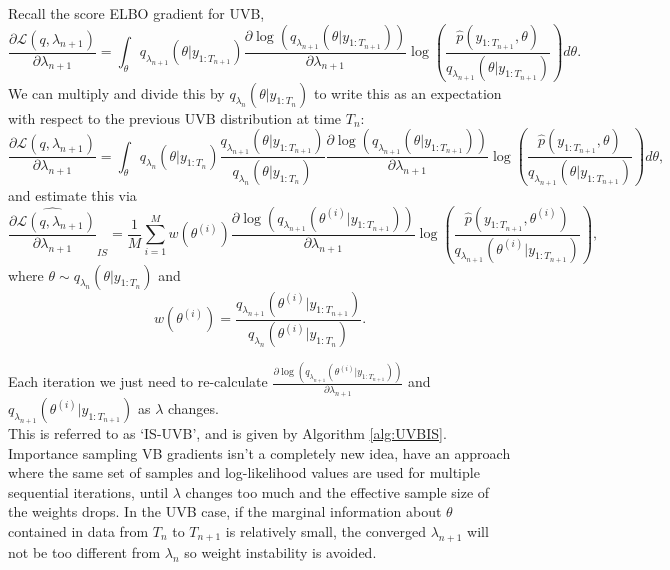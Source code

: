 \documentclass[12pt,a4paper]{article}\usepackage[]{graphicx}\usepackage[]{color}
\begin{document}
Recall the score ELBO gradient for UVB,
\begin{equation}
\label{UVBIS:scoreGrad}
\frac{\partial\mathcal{L}(q, \lambda_{n+1})}{\partial \lambda_{n+1}} = \int_{\theta} q_{\lambda_{n+1}}(\theta | y_{1:T_{n+1}}) \frac{\partial \log(q_{\lambda_{n+1}}(\theta | y_{1:T_{n+1}}))}{\partial \lambda_{n+1}} \log \left(\frac{\hat{p}(y_{1:T_{n+1}}, \theta)}{q_{\lambda_{n+1}}(\theta | y_{1:T_{n+1}})} \right) d\theta.
\end{equation}
We can multiply and divide this by $q_{\lambda_n}(\theta | y_{1:T_n})$ to write this as an expectation with respect to the previous UVB distribution at time $T_n$:
\begin{equation}
\label{UVBIS:scoreGradIS}
\frac{\partial\mathcal{L}(q, \lambda_{n+1})}{\partial \lambda_{n+1}} = \int_{\theta} q_{\lambda_{n}}(\theta | y_{1:T_{n}})\frac{q_{\lambda_{n+1}}(\theta | y_{1:T_{n+1}})}{q_{\lambda_{n}}(\theta | y_{1:T_{n}})} \frac{\partial \log(q_{\lambda_{n+1}}(\theta | y_{1:T_{n+1}}))}{\partial \lambda_{n+1}} \log \left(\frac{\hat{p}(y_{1:T_{n+1}}, \theta)}{q_{\lambda_{n+1}}(\theta | y_{1:T_{n+1}})} \right) d\theta,
\end{equation}
and estimate this via
\begin{equation}
\label{UVBIS:scoreEstIS}
\widehat{\frac{\partial\mathcal{L}(q, \lambda_{n+1})}{\partial \lambda_{n+1}}}_{IS} = \frac{1}{M} \sum_{i=1}^M w(\theta^{(i)})\frac{\partial \log(q_{\lambda_{n+1}}(\theta^{(i)} | y_{1:T_{n+1}}))}{\partial \lambda_{n+1}} \log \left(\frac{\hat{p}(y_{1:T_{n+1}}, \theta^{(i)})}{q_{\lambda_{n+1}}(\theta^{(i)} | y_{1:T_{n+1}})} \right),
\end{equation}
where $\theta \sim q_{\lambda_{n}}(\theta | y_{1:{T_n}})$ and 
\begin{equation}
w(\theta^{(i)}) = \frac{q_{\lambda_{n+1}}(\theta^{(i)} | y_{1:T_{n+1}})}{q_{\lambda_{n}}(\theta^{(i)} | y_{1:T_{n}})}.
\end{equation}

Each iteration we just need to re-calculate $\frac{\partial \log(q_{\lambda_{n+1}}(\theta^{(i)} | y_{1:T_{n+1}}))}{\partial \lambda_{n+1}}$ and $q_{\lambda_{n+1}}(\theta^{(i)} | y_{1:T_{n+1}})$ as $\lambda$ changes.
\\

This is referred to as `IS-UVB', and is given by Algorithm \ref{alg:UVBIS}.
\\


Importance sampling VB gradients isn't a completely new idea, \citet{Sakaya2017} have an approach where the same set of samples and log-likelihood values are used for multiple sequential iterations, until $\lambda$ changes too much and the effective sample size of the weights drops. In the UVB case, if the marginal information about $\theta$ contained in data from $T_n$ to $T_{n+1}$ is relatively small, the converged $\lambda_{n+1}$ will not be too different from $\lambda_n$ so weight instability is avoided.
\\
\end{document}
